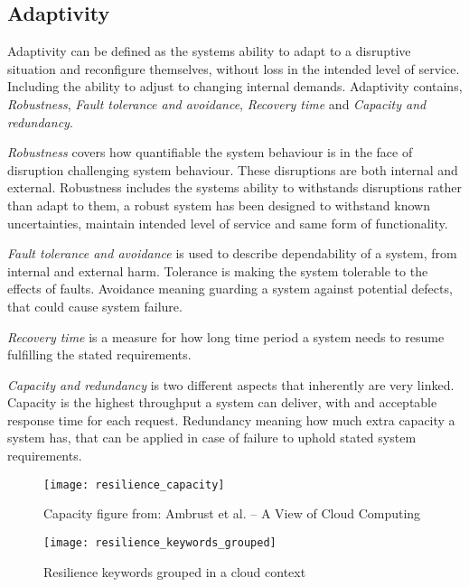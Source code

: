 \subsection{Adaptivity} 
Adaptivity can be defined as the systems ability to adapt to a disruptive situation and reconfigure themselves, without loss in the intended level of service. Including the ability to adjust to changing internal demands\cite{reed2009methodology}. Adaptivity contains, \textit{Robustness}, \textit{Fault tolerance and avoidance}, \textit{Recovery time} and \textit{Capacity and redundancy}.


\textit{Robustness} covers how quantifiable the system behaviour is in the face of disruption challenging system behaviour\cite[p. 10]{sterbenz2010resilience}. These disruptions are both internal and external\cite{omer2013resilience}. Robustness includes the systems ability to withstands disruptions rather than adapt to them, a robust system has been designed to withstand known uncertainties, maintain intended level of service and same form of functionality.


\textit{Fault tolerance and avoidance} is used to describe dependability of a system, from internal and external harm. Tolerance is making the system tolerable to the effects of faults. Avoidance meaning guarding a system against potential defects, that could cause system failure\cite{strigini2012fault}.


\textit{Recovery time} is a measure for how long time period a system needs to resume fulfilling the stated requirements.


\textit{Capacity and redundancy} is two different aspects that inherently are very linked. Capacity is the highest throughput a system can deliver, with and acceptable response time for each request\cite[p. 136]{nygard2007release}. Redundancy meaning how much extra capacity a system has, that can be applied in case of failure to uphold stated system requirements.
\begin{figure}[!htb]
  \texttt{[image: resilience\_capacity]}  
  \caption{Capacity figure from: Ambrust et al. – A View of Cloud Computing   }
  \label{fig:resilience_keywords_grouped}
\end{figure}

\begin{figure}[!htb]
  \texttt{[image: resilience\_keywords\_grouped]}  
  \caption{Resilience keywords grouped in a cloud context}
  \label{fig:resilience_keywords_grouped}
\end{figure}

